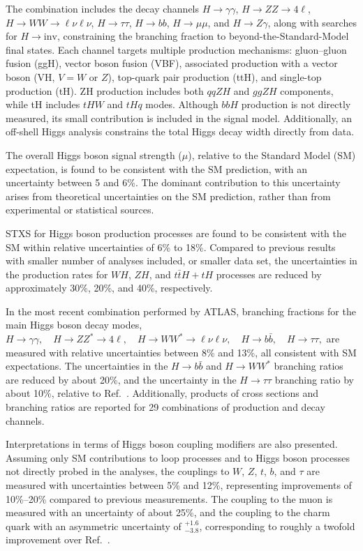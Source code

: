 \documentclass[a4paper,11pt]{article}
\begin{document}
The combination includes the decay channels $H \to \gamma\gamma$, $H
\to ZZ \to 4\ell$, $H \to WW \to \ell\nu\ell\nu$, $H \to \tau\tau$, $H
\to bb$, $H \to \mu\mu$, and $H \to Z\gamma$, along with searches for
$H \to \text{inv}$, constraining the branching fraction to
beyond-the-Standard-Model final states. Each channel targets multiple
production mechanisms: gluon--gluon fusion (ggH), vector boson fusion
(VBF), associated production with a vector boson (VH, $V = W$ or $Z$),
top-quark pair production (ttH), and single-top production (tH). ZH
production includes both $qqZH$ and $ggZH$ components, while tH
includes $tHW$ and $tHq$ modes. Although $bbH$ production is not
directly measured, its small contribution is included in the signal
model. Additionally, an off-shell Higgs analysis constrains the total
Higgs decay width directly from data.

The overall Higgs boson signal strength ($\mu$), relative to the
Standard Model (SM) expectation, is found to be consistent with the SM
prediction, with an uncertainty between 5 and 6\%.  The dominant
contribution to this uncertainty arises from theoretical uncertainties
on the SM prediction, rather than from experimental or statistical
sources.

STXS for Higgs boson production processes are found to be consistent
with the SM within relative uncertainties of 6\% to 18\%. Compared to
previous results with smaller number of analyses included, or smaller data set, the uncertainties in the production rates for $WH$,
$ZH$, and $t\bar{t}H + tH$ processes are reduced by approximately
30\%, 20\%, and 40\%, respectively.

In the most recent combination performed by ATLAS, branching fractions for the main Higgs boson decay modes,
$
H \to \gamma\gamma, \quad
H \to ZZ^* \to 4\ell, \quad
H \to WW^* \to \ell\nu\ell\nu, \quad
H \to b\bar{b}, \quad
H \to \tau\tau,
$
are measured with relative uncertainties between 8\% and 13\%, all consistent with SM expectations. 
The uncertainties in the $H \to b\bar{b}$ and $H \to WW^*$ branching ratios are reduced by about 20\%, 
and the uncertainty in the $H \to \tau\tau$ branching ratio by about 10\%, relative to Ref.~\cite{atlas-comb}. 
Additionally, products of cross sections and branching ratios are reported for 29 combinations of 
production and decay channels.

Interpretations in terms of Higgs boson coupling modifiers are also
presented. Assuming only SM contributions to loop processes and to
Higgs boson processes not directly probed in the analyses, the
couplings to $W$, $Z$, $t$, $b$, and $\tau$ are measured with
uncertainties between 5\% and 12\%, representing improvements of
10\%--20\% compared to previous measurements. The coupling to the muon
is measured with an uncertainty of about 25\%, and the coupling to the
charm quark with an asymmetric uncertainty of $^{+1.6}_{-3.8}$,
corresponding to roughly a twofold improvement over
Ref.~\cite{atlas-comb}.
\end{document}
